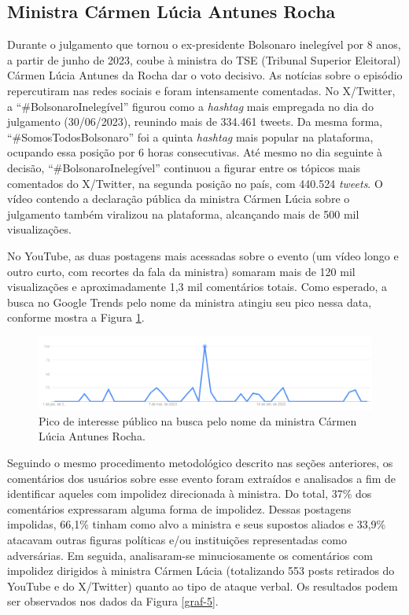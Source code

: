 \documentclass[portuguese]{textolivre}
\begin{document}
\subsection{Ministra Cármen Lúcia Antunes Rocha}
Durante o julgamento que tornou o ex-presidente Bolsonaro inelegível por 8 anos, a partir de junho de 2023, coube à ministra do TSE (Tribunal Superior Eleitoral) Cármen Lúcia Antunes da Rocha dar o voto decisivo. As notícias sobre o episódio repercutiram nas redes sociais e foram intensamente comentadas. No X/Twitter, a ``\#BolsonaroInelegível'' figurou como a \textit{hashtag} mais empregada no dia do julgamento (30/06/2023), reunindo mais de 334.461 tweets. Da mesma forma, ``\#SomosTodosBolsonaro'' foi a quinta \textit{hashtag} mais popular na plataforma, ocupando essa posição por 6 horas consecutivas. Até mesmo no dia seguinte à decisão, ``\#BolsonaroInelegível'' continuou a figurar entre os tópicos mais comentados do X/Twitter, na segunda posição no país, com 440.524 \textit{tweets}. O vídeo contendo a declaração pública da ministra Cármen Lúcia sobre o julgamento também viralizou na plataforma, alcançando mais de 500 mil visualizações.

No YouTube, as duas postagens mais acessadas sobre o evento (um vídeo longo e outro curto, com recortes da fala da ministra) somaram mais de 120 mil visualizações e aproximadamente 1,3 mil comentários totais. Como esperado, a busca no Google Trends pelo nome da ministra atingiu seu pico nessa data, conforme mostra a Figura \ref{graf-4}.

\begin{figure}[h!]
\centering
\begin{minipage}{.90\textwidth}
\includegraphics[width =\textwidth]{Fig6.png}
\caption{Pico de interesse público na busca pelo nome da ministra Cármen Lúcia Antunes Rocha.}
\label{graf-4}
\end{minipage}
\end{figure}

Seguindo o mesmo procedimento metodológico descrito nas seções anteriores, os comentários dos usuários sobre esse evento foram extraídos e analisados a fim de identificar aqueles com impolidez direcionada à ministra. Do total, 37\% dos comentários expressaram alguma forma de impolidez. Dessas postagens impolidas, 66,1\% tinham como alvo a ministra e seus supostos aliados e 33,9\% atacavam outras figuras políticas e/ou instituições representadas como adversárias. Em seguida, analisaram-se minuciosamente os comentários com impolidez dirigidos à ministra Cármen Lúcia (totalizando 553 posts retirados do YouTube e do X/Twitter) quanto ao tipo de ataque verbal. Os resultados podem ser observados nos dados da Figura \ref{graf-5}.
\end{document}

